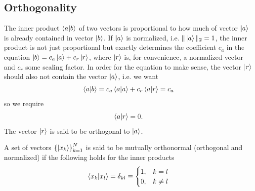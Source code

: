 \subsection{Orthogonality}
The inner product $\braket{a}{b}$ of two vectors is proportional to how much of vector $\ket{a}$ is already contained in vector $\ket{b}$. If $\ket{a}$ is normalized, i.e. $\|\ket{a}\|_2=1$, the inner product is not just proportional but exactly determines the coefficient $c_a$ in the equation $\ket{b} = c_a\ket{a} + c_r\ket{r}$, where $\ket{r}$ is, for convenience, a normalized vector and $c_r$ some scaling factor.
In order for the equation to make sense, the vector $\ket{r}$ should also not contain the vector $\ket{a}$, i.e. we want
\begin{align}
    \bra{a}\ket{b} = c_a \bra{a}\ket{a} + c_r \bra{a}\ket{r} = c_a
\end{align}
so we require
\begin{align}
    \bra{a}\ket{r} = 0.
\end{align}
The vector $\ket{r}$ is said to be orthogonal to $\ket{a}$.
\begin{def*}[orthonormality] A set of vectors $\left\{\ket{x_k}\right\}_{k=1}^{N}$ is said to be mutually orthonormal (orthogonal and normalized) if the following holds for the inner products
\begin{align*}
    \bra{x_k}\ket{x_l} = \delta_{kl} \equiv \begin{cases}
        1 ,& k=l\\
        0 ,& k\neq l
    \end{cases}
\end{align*}
\end{def*}
